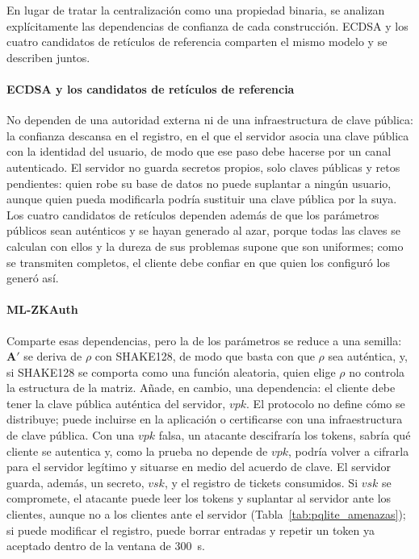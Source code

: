 En lugar de tratar la centralización como una propiedad binaria, se analizan
explícitamente las dependencias de confianza de cada construcción. ECDSA y los cuatro candidatos de retículos de referencia comparten el mismo modelo y se describen juntos.

\paragraph{ECDSA y los candidatos de retículos de referencia}
No dependen de una autoridad externa ni de una infraestructura de clave pública: la confianza descansa en el registro, en el que el servidor asocia una clave pública con la identidad del usuario, de modo que ese paso debe hacerse por un canal autenticado. El servidor no guarda secretos propios, solo claves públicas y retos pendientes: quien robe su base de datos no puede suplantar a ningún usuario, aunque quien pueda modificarla podría sustituir una clave pública por la suya. Los cuatro candidatos de retículos dependen además de que los parámetros públicos sean auténticos y se hayan generado al azar, porque todas las claves se calculan con ellos y la dureza de sus problemas supone que son uniformes; como se transmiten completos, el cliente debe confiar en que quien los configuró los generó así.

\paragraph{ML-ZKAuth}
Comparte esas dependencias, pero la de los parámetros se reduce a una semilla: $\mathbf{A}'$ se deriva de $\rho$ con SHAKE128, de modo que basta con que $\rho$ sea auténtica, y, si SHAKE128 se comporta como una función aleatoria, quien elige $\rho$ no controla la estructura de la matriz. Añade, en cambio, una dependencia: el cliente debe tener la clave pública auténtica del servidor, $vpk$. El protocolo no define cómo se distribuye; puede incluirse en la aplicación o certificarse con una infraestructura de clave pública. Con una $vpk$ falsa, un atacante descifraría los tokens, sabría qué cliente se autentica y, como la prueba no depende de $vpk$, podría volver a cifrarla para el servidor legítimo y situarse en medio del acuerdo de clave. El servidor guarda, además, un secreto, $vsk$, y el registro de tickets consumidos. Si $vsk$ se compromete, el atacante puede leer los tokens y suplantar al servidor ante los clientes, aunque no a los clientes ante el servidor (Tabla~\ref{tab:pqlite_amenazas}); si puede modificar el registro, puede borrar entradas y repetir un token ya aceptado dentro de la ventana de 300~s.

